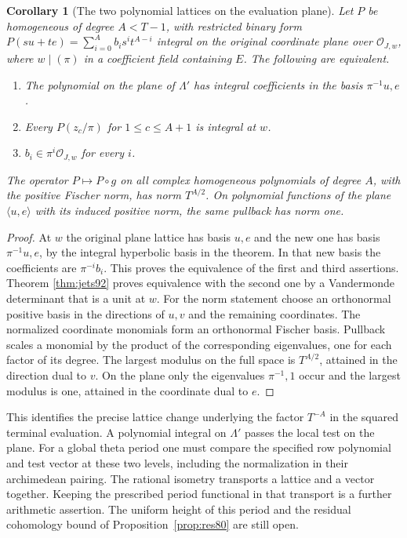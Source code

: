 \documentclass[a4paper,11pt]{article}
\newtheorem{corollary}[proposition]{Corollary}
\theoremstyle{definition}
\theoremstyle{remark}
\numberwithin{equation}{section}
\begin{document}
\begin{corollary}[The two polynomial lattices on the evaluation plane]
\label{cor:plane93}
Let \(P\) be homogeneous of degree \(A<T-1\), with restricted
binary form \(P(su+te)=\sum_{i=0}^{A}b_i s^it^{A-i}\) integral
on the original coordinate plane over \(\mathcal O_{J,w}\),
where \(w\mid(\pi)\) in a coefficient field containing \(E\).
The following are equivalent.
\begin{enumerate}
\item The polynomial on the plane of \(\Lambda'\) has integral
coefficients in the basis \(\pi^{-1}u,e\).
\item Every \(P(z_c/\pi)\) for \(1\le c\le A+1\) is integral at \(w\).
\item \(b_i\in\pi^i\mathcal O_{J,w}\) for every \(i\).
\end{enumerate}
The operator \(P\mapsto P\circ g\) on all complex homogeneous
polynomials of degree \(A\), with the positive Fischer norm,
has norm \(T^{A/2}\). On polynomial functions of the plane
\(\langle u,e\rangle\) with its induced positive norm, the
same pullback has norm one.
\end{corollary}
\begin{proof}
At \(w\) the original plane lattice has basis \(u,e\) and the
new one has basis \(\pi^{-1}u,e\), by the integral hyperbolic
basis in the theorem. In that new basis the coefficients are
\(\pi^{-i}b_i\). This proves the equivalence of the first and
third assertions. Theorem \ref{thm:jets92} proves equivalence
with the second one by a Vandermonde determinant that is a
unit at \(w\). For the norm statement choose an orthonormal
positive basis in the directions of \(u,v\) and the remaining
coordinates. The normalized coordinate monomials form an
orthonormal Fischer basis. Pullback scales a monomial by
the product of the corresponding eigenvalues, one for each
factor of its degree. The largest modulus on the full space
is \(T^{A/2}\), attained in the direction dual to \(v\).
On the plane only the eigenvalues \(\pi^{-1},1\) occur and
the largest modulus is one, attained in the coordinate dual to \(e\).
\end{proof}

This identifies the precise lattice change underlying the
factor \(T^{-A}\) in the squared terminal evaluation. A
polynomial integral on \(\Lambda'\) passes the local test on
the plane. For a global theta period one must compare the
specified row polynomial and test vector at these two levels,
including the normalization in their archimedean pairing.
The rational isometry transports a lattice and a vector
together. Keeping the prescribed period functional in that
transport is a further arithmetic assertion. The uniform
height of this period and the residual cohomology bound of
Proposition~\ref{prop:res80} are still open.
\end{document}
